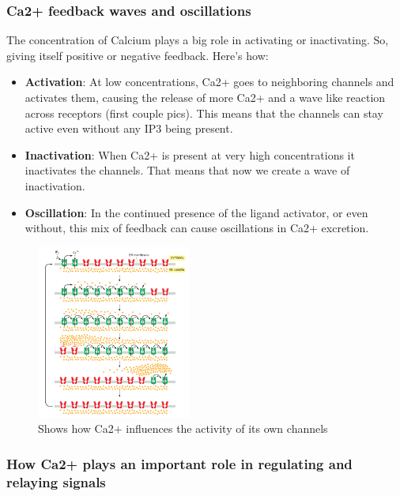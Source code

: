 \documentclass[../main.tex]{subfiles}
\begin{document}
\subsubsection{Ca2+ feedback waves and oscillations}

The concentration of \gls{Calcium} plays a big role in activating or inactivating. So, giving itself positive or negative feedback. Here's how:
\begin{itemize}
	\item \textbf{Activation}: At low concentrations, Ca2+ goes to neighboring channels and activates them, causing the release of more Ca2+ and a wave like reaction across receptors (first couple pics). This means that the channels can stay active even without any IP3 being present.
	\item \textbf{Inactivation}: When Ca2+ is present at very high concentrations it inactivates the channels. That means that now we create a wave of inactivation.
	\item \textbf{\gls{Oscillation}}: In the continued presence of the ligand activator, or even without, this mix of feedback can cause oscillations in Ca2+ excretion.
\end{itemize}
\begin{figure}[H]
	\centering
	\includegraphics[width=0.45\textwidth]{Ca2_waves}
	\caption{Shows how Ca2+ influences the activity of its own channels}
\end{figure}

\subsubsection{How Ca2+ plays an important role in regulating and relaying signals}
\end{document}
